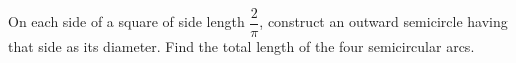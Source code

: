 On each side of a square of side length $\dfrac{2}{\pi}$, construct an outward semicircle having that side as its diameter. Find the total length of the four semicircular arcs.

